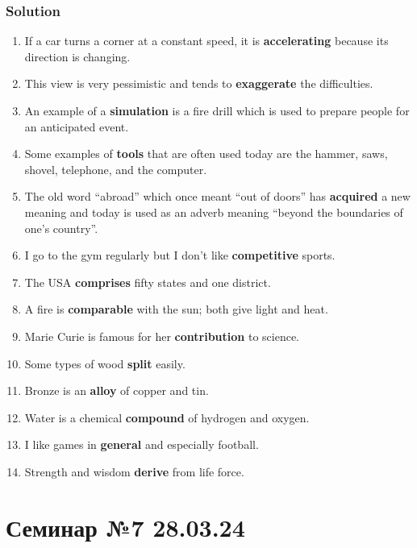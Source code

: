 \subsection*{Solution}
\begin{enumerate}
      \item If a car turns a corner at a constant speed, it is \textbf{accelerating} because its direction is changing.
      \item This view is very pessimistic and tends to \textbf{exaggerate} the difficulties.
      \item An example of a \textbf{simulation} is a fire drill which is used to prepare people for an anticipated event.
      \item Some examples of \textbf{tools} that are often used today are the hammer, saws, shovel, telephone, and the computer.
      \item The old word “abroad” which once meant “out of doors” has \textbf{acquired} a new meaning and today is used as an adverb meaning “beyond the boundaries of one’s country”.
      \item I go to the gym regularly but I don’t like \textbf{competitive} sports.
      \item The USA \textbf{comprises} fifty states and one district.
      \item A fire is \textbf{comparable} with the sun; both give light and heat.
      \item Marie Curie is famous for her \textbf{contribution} to science.
      \item Some types of wood \textbf{split} easily.
      \item Bronze is an \textbf{alloy} of copper and tin.
      \item Water is a chemical \textbf{compound} of hydrogen and oxygen.
      \item I like games in \textbf{general} and especially football.
      \item Strength and wisdom \textbf{derive} from life force.
\end{enumerate}

\chapter{Семинар №7 28.03.24}